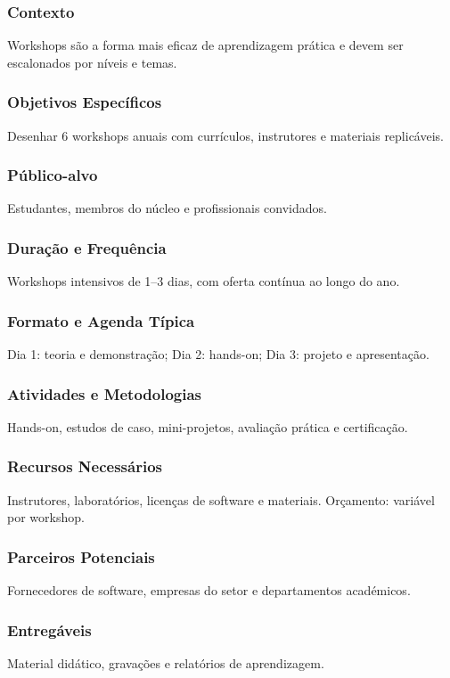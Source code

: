 \documentclass[12pt,a4paper]{article}
\begin{document}
\subsubsection*{Contexto}
Workshops são a forma mais eficaz de aprendizagem prática e devem ser escalonados por níveis e temas.

\subsubsection*{Objetivos Específicos}
Desenhar 6 workshops anuais com currículos, instrutores e materiais replicáveis.

\subsubsection*{Público-alvo}
Estudantes, membros do núcleo e profissionais convidados.

\subsubsection*{Duração e Frequência}
Workshops intensivos de 1–3 dias, com oferta contínua ao longo do ano.

\subsubsection*{Formato e Agenda Típica}
Dia 1: teoria e demonstração; Dia 2: hands-on; Dia 3: projeto e apresentação.

\subsubsection*{Atividades e Metodologias}
Hands-on, estudos de caso, mini-projetos, avaliação prática e certificação.

\subsubsection*{Recursos Necessários}
Instrutores, laboratórios, licenças de software e materiais. Orçamento: variável por workshop.

\subsubsection*{Parceiros Potenciais}
Fornecedores de software, empresas do setor e departamentos académicos.

\subsubsection*{Entregáveis}
Material didático, gravações e relatórios de aprendizagem.
\end{document}
